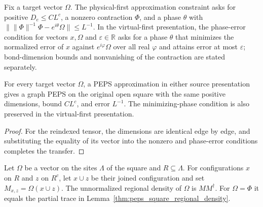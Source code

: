\begin{definition}
    \label{def:peps_source_approximation_constraints}
    \leanok
    Fix a target vector $\Omega$. The physical-first approximation constraint asks
    for positive $D_e\le CL^c$, a nonzero contraction $\Phi$, and a phase $\theta$
    with $\|\|\Phi\|^{-1}\Phi-e^{i\theta}\Omega\|\le L^{-1}$. In the virtual-first
    presentation, the phase-error condition for vectors $x,\Omega$ and
    $\varepsilon\in\mathbb R$ asks for a phase $\theta$ that minimizes the
    normalized error of $x$ against $e^{i\varphi}\Omega$ over all real $\varphi$ and
    attains error at most $\varepsilon$; bond-dimension bounds and nonvanishing of
    the contraction are stated separately.
\end{definition}

\begin{lemma}
    \label{thm:peps_square_approximation_transfer}
    \leanok
    For every target vector $\Omega$, a PEPS approximation in either source
    presentation gives a graph PEPS on the original open square with the same positive dimensions, bound $CL^c$,
    and error $L^{-1}$. The minimizing-phase condition is also preserved in the
    virtual-first presentation.
\end{lemma}
\begin{proof}
    \leanok
    For the reindexed tensor, the dimensions are identical edge by edge, and
    substituting the equality of its vector into the nonzero and phase-error
    conditions completes the transfer.
\end{proof}


\begin{definition}
    \label{def:peps_pinned_regional_matrix}
    \leanok
    Let $\Omega$ be a vector on the sites $\Lambda$ of the square and
    $R\subseteq\Lambda$. For configurations $x$ on $R$ and $z$ on $R^c$, let
    $x\cup z$ be their joined configuration and set $M_{x,z}=\Omega(x\cup z)$. The
    unnormalized regional density of $\Omega$ is $MM^\dagger$. For $\Omega=\Phi$
    it equals the partial trace in Lemma~\ref{thm:peps_square_regional_density}.
\end{definition}
